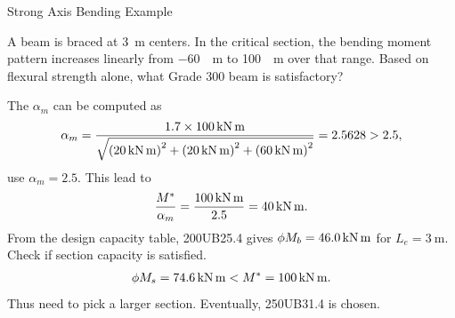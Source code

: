 \begin{exmp}
Strong Axis Bending Example

A beam is braced at \SI{3}{\meter} centers. In the critical section, the bending moment pattern increases linearly from \SI{-60}{\kn\meter} to \SI{100}{\kn\meter} over that range. Based on flexural strength alone, what Grade 300 beam is satisfactory?
\begin{figure}[H]

\end{figure}
\end{exmp}
\begin{solution}
The $\alpha_m$ can be computed as
\begin{gather*}
\alpha_m=\dfrac{1.7\times\SI{100}{\kilo\newton\meter}}{\sqrt{\left(\SI{20}{\kilo\newton\meter}\right)^2+\left(\SI{20}{\kilo\newton\meter}\right)^2+\left(\SI{60}{\kilo\newton\meter}\right)^2}}=2.5628>2.5,
\end{gather*}
use $\alpha_m=2.5$. This lead to
\begin{gather*}
\dfrac{M^*}{\alpha_m}=\dfrac{\SI{100}{\kilo\newton\meter}}{2.5}=\SI{40}{\kilo\newton\meter}.
\end{gather*}
From the design capacity table, 200UB25.4 gives $\phi{}M_b=\SI{46.0}{\kilo\newton\meter}$ for $L_e=\SI{3}{\meter}$. Check if section capacity is satisfied.
\begin{gather*}
\phi{}M_s=\SI{74.6}{\kilo\newton\meter}<M^*=\SI{100}{\kilo\newton\meter}.
\end{gather*}
Thus need to pick a larger section. Eventually, 250UB31.4 is chosen.
\end{solution}
